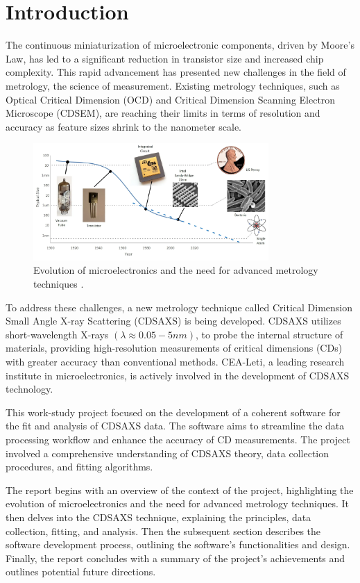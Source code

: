 \section{Introduction}

\medskip

The continuous miniaturization of microelectronic components, driven by Moore's Law, 
has led to a significant reduction in transistor size and increased chip complexity.
This rapid advancement has presented new challenges in the field of metrology, the science of measurement.
Existing metrology techniques, such as Optical Critical Dimension (OCD) and Critical Dimension Scanning 
Electron Microscope (CDSEM), are reaching their limits in terms of resolution and accuracy as feature sizes
shrink to the nanometer scale.

\medskip

\begin{figure}[H]
    \centering
    \includegraphics[width=0.8\textwidth]{images/moore's_law.png}
    \caption{Evolution of microelectronics and the need for advanced metrology techniques \cite{moore_law}.}
    \label{fig:evolution_microelectronics}
\end{figure}

To address these challenges, a new metrology technique called Critical Dimension Small Angle X-ray Scattering
(CDSAXS) is being developed. CDSAXS utilizes short-wavelength X-rays $(\lambda \approx 0.05 - 5 nm)$, to probe the internal structure of
materials, providing high-resolution measurements of critical dimensions (CDs) with greater accuracy than
conventional methods. CEA-Leti, a leading research institute in microelectronics, is actively involved in
the development of CDSAXS technology.

\medskip

This work-study project focused on the development of a coherent software for the fit and analysis of CDSAXS
data. The software aims to streamline the data processing workflow and enhance the accuracy of CD measurements.
The project involved a comprehensive understanding of CDSAXS theory, data collection procedures, and fitting
algorithms.

\medskip

The report begins with an overview of the context of the project, highlighting the evolution of
microelectronics and the need for advanced metrology techniques. It then delves into the CDSAXS technique, 
explaining the principles, data collection, fitting, and analysis. Then the subsequent
section describes the software development process, outlining the software's functionalities and design. Finally, the report concludes with a summary of the project's achievements and
outlines potential future directions.